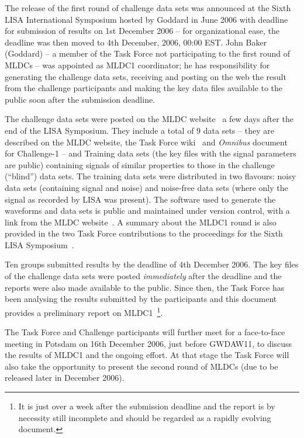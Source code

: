 \documentclass[11pt]{article}
\begin{document}
The release of the first round of challenge data sets was announced at the Sixth LISA International Symposium hosted by Goddard in June 2006 with deadline for submission of results on 1st December 2006 -- for organizational ease, the deadline was then moved to 4th December, 2006, 00:00 EST. John Baker (Goddard) -- a member of the Task Force not participating to the first round of MLDCs -- was appointed as MLDC1 coordinator; he has responsibility for generating the challenge data sets, receiving and posting on the web the result from the challenge participants and making the key data files available to the public soon after the submission deadline. 

The challenge data sets were posted on the MLDC website~\cite{mldcweb} a few days after the end of the LISA Symposium. They include a total of 9 data sets -- they are described on the MLDC website, the Task Force wiki~\cite{mldcwiki} and \emph{Omnibus} document for Challenge-1 \cite{omnibus} -- and Training data sets (the key files with the signal parameters are public) containing signals of similar properties to those in the challenge (``blind'') data sets. The training data sets were distributed in two flavours: noisy data sets (containing signal and noise) and noise-free data sets (where only the signal as recorded by LISA was present). The software used to generate the waveforms and data sets is public and maintained under version control, with a link from the MLDC website~\cite{mldcweb}. A summary about the MLDC1 round is also provided in the two Task Force contributions to the proceedings for the Sixth LISA Symposium~\cite{mldcproc1,mldcproc2}. 

Ten groups submitted results by the deadline of 4th December 2006. The key files of the challenge data sets were posted {\em immediately} after the deadline and the reports were also made available to the public. Since then, the Task Force has been analysing the results submitted by the participants and this document provides a preliminary report on MLDC1~\footnote{It is just over a week after the submission deadline and the report is by necessity still incomplete and should be regarded as a rapidly evolving document.}. 

The Task Force and Challenge participants will further meet for a face-to-face meeting in Potsdam on 16th December 2006, just before GWDAW11, to discuss the results of MLDC1 and the ongoing effort. At that stage the Task Force will also take the opportunity to present the second round of MLDCs (due to be released later in December 2006).
\end{document}
